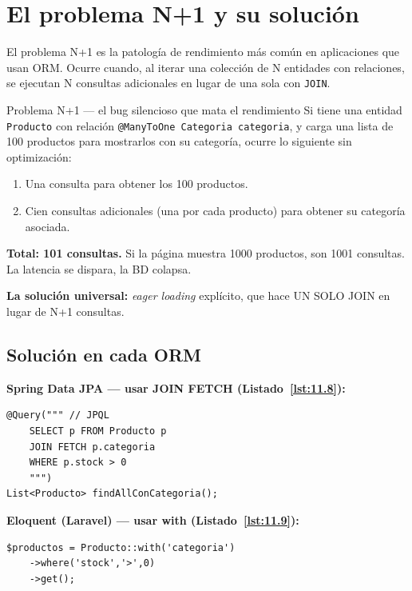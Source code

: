 \section{El problema N+1 y su solución}

El problema N+1 es la patología de rendimiento más común en
aplicaciones que usan ORM. Ocurre cuando, al iterar una colección
de N entidades con relaciones, se ejecutan N consultas adicionales
en lugar de una sola con \texttt{JOIN}.


\begin{cajaadvertencia}{Problema N+1 --- el bug silencioso que mata el rendimiento}
Si tiene una entidad \texttt{Producto} con relación
\texttt{@ManyToOne Categoria categoria}, y carga una lista de 100
productos para mostrarlos con su categoría, ocurre lo siguiente sin
optimización:

\begin{enumerate}
\item Una consulta para obtener los 100 productos.
\item Cien consultas adicionales (una por cada producto) para
obtener su categoría asociada.
\end{enumerate}

\textbf{Total: 101 consultas.} Si la página muestra 1000 productos,
son 1001 consultas. La latencia se dispara, la BD colapsa.

\textbf{La solución universal:} \emph{eager loading} explícito, que
hace UN SOLO JOIN en lugar de N+1 consultas.
\end{cajaadvertencia}

\subsection{Solución en cada ORM}

\textbf{Spring Data JPA --- usar JOIN FETCH (Listado~\ref{lst:11.8}):}
\begin{lstlisting}[style=java,numbers=none,caption={Ejemplo de Java},label=lst:11.8]
@Query(""" // JPQL
    SELECT p FROM Producto p
    JOIN FETCH p.categoria
    WHERE p.stock > 0
    """)
List<Producto> findAllConCategoria();
\end{lstlisting}

\textbf{Eloquent (Laravel) --- usar with (Listado~\ref{lst:11.9}):}
\begin{lstlisting}[style=php,numbers=none,caption={Ejemplo de PHP},label=lst:11.9]
$productos = Producto::with('categoria')
    ->where('stock','>',0)
    ->get();
\end{lstlisting}

